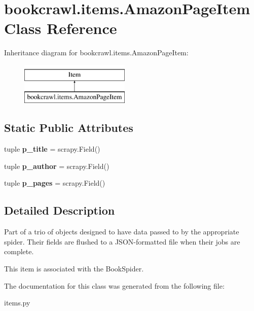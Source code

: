 \hypertarget{classbookcrawl_1_1items_1_1AmazonPageItem}{}\section{bookcrawl.\+items.\+Amazon\+Page\+Item Class Reference}
\label{classbookcrawl_1_1items_1_1AmazonPageItem}
Inheritance diagram for bookcrawl.\+items.\+Amazon\+Page\+Item\+:\begin{figure}[H]
\begin{center}
\leavevmode
\includegraphics[height=2.000000cm]{classbookcrawl_1_1items_1_1AmazonPageItem}
\end{center}
\end{figure}
\subsection*{Static Public Attributes}
\begin{DoxyCompactItemize}
\item 
\hypertarget{classbookcrawl_1_1items_1_1AmazonPageItem_a7381e478950d2ba174ccc7c902a7f7fe}{}tuple {\bfseries p\+\_\+title} = scrapy.\+Field()\label{classbookcrawl_1_1items_1_1AmazonPageItem_a7381e478950d2ba174ccc7c902a7f7fe}

\item 
\hypertarget{classbookcrawl_1_1items_1_1AmazonPageItem_a55a509fe9e5f3751689d47ee84afb10e}{}tuple {\bfseries p\+\_\+author} = scrapy.\+Field()\label{classbookcrawl_1_1items_1_1AmazonPageItem_a55a509fe9e5f3751689d47ee84afb10e}

\item 
\hypertarget{classbookcrawl_1_1items_1_1AmazonPageItem_a510f90f21779b357829320f6109655d4}{}tuple {\bfseries p\+\_\+pages} = scrapy.\+Field()\label{classbookcrawl_1_1items_1_1AmazonPageItem_a510f90f21779b357829320f6109655d4}

\end{DoxyCompactItemize}


\subsection{Detailed Description}
\begin{DoxyVerb}Part of a trio of objects designed to have data passed to
by the appropriate spider. Their fields are flushed to
a JSON-formatted file when their jobs are complete.

This item is associated with the BookSpider.
\end{DoxyVerb}
 

The documentation for this class was generated from the following file\+:\begin{DoxyCompactItemize}
\item 
items.\+py\end{DoxyCompactItemize}
